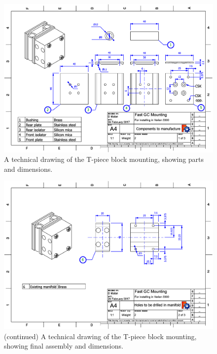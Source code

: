 \begin{figure}
	\centering
	\includegraphics[angle=90, origin=c, scale=0.75]{Figures/CarDrawing1.pdf}
	\decoRule	
	
	\caption[Technical drawing of coaxial heater mounting.]{A technical drawing of
	the T-piece block mounting, showing parts and dimensions.}
	
	\label{fig:CarsDrawing1}
\end{figure}

\begin{figure}
	\ContinuedFloat
	\centering
	\includegraphics[angle=90, origin=c, scale=0.75]{Figures/CarDrawing2.pdf}
	\decoRule	
	
	\caption[]{(continued) A technical drawing of the T-piece block mounting,
	showing final assembly and dimensions.}
	
\end{figure}

